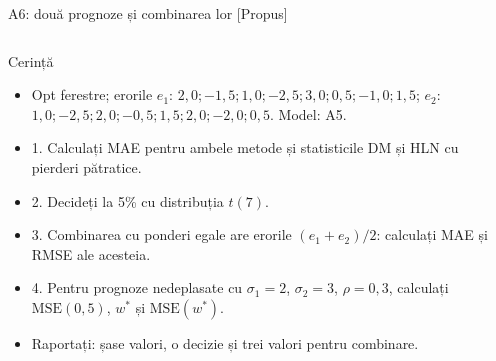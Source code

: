 \begin{frame}{A6: două prognoze și combinarea lor [Propus]}
\propsub
\itemsize{\scriptsize}
\begin{columns}[T]
\begin{column}{\taskw}
\begin{block}{Cerință}
\begin{itemize}
    \item Opt ferestre; erorile $e_1$: $2{,}0; -1{,}5; 1{,}0; -2{,}5; 3{,}0; 0{,}5; -1{,}0; 1{,}5$; $e_2$: $1{,}0; -2{,}5; 2{,}0; -0{,}5; 1{,}5; 2{,}0; -2{,}0; 0{,}5$. Model: A5.
    \item 1. Calculați MAE pentru ambele metode și statisticile DM și HLN cu pierderi pătratice.
    \item 2. Decideți la 5\% cu distribuția $t(7)$.
    \item 3. Combinarea cu ponderi egale are erorile $(e_1 + e_2)/2$: calculați MAE și RMSE ale acesteia.
    \item 4. Pentru prognoze nedeplasate cu $\sigma_1 = 2$, $\sigma_2 = 3$, $\rho = 0{,}3$, calculați $\mathrm{MSE}(0{,}5)$, $w^*$ și $\mathrm{MSE}(w^*)$.
    \item Raportați: șase valori, o decizie și trei valori pentru combinare.
\end{itemize}
\end{block}
\end{column}
\begin{column}{\solw}
\end{column}
\end{columns}
\end{frame}


